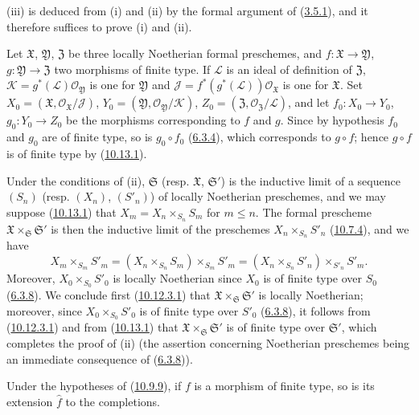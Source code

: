 (iii) is deduced from (i) and (ii) by the formal argument of
(\hyperref[I.3.5.1]{3.5.1}), and it therefore suffices to prove (i) and (ii).

Let $\mathfrak{X}$, $\mathfrak{Y}$, $\mathfrak{Z}$ be three locally
Noetherian formal preschemes, and $f:\mathfrak{X}\to\mathfrak{Y}$,
$g:\mathfrak{Y}\to\mathfrak{Z}$ two morphisms of finite type. If
$\mathscr{L}$ is an ideal of definition of $\mathfrak{Z}$,
$\mathscr{K}=g^*(\mathscr{L})\mathscr{O}_{\mathfrak{Y}}$ is one for
$\mathfrak{Y}$ and
$\mathscr{J}=f^*(g^*(\mathscr{L}))\mathscr{O}_{\mathfrak{X}}$ is one
for $\mathfrak{X}$. Set
$X_0=(\mathfrak{X},\mathscr{O}_{\mathfrak{X}}/\mathscr{J})$,
$Y_0=(\mathfrak{Y},\mathscr{O}_{\mathfrak{Y}}/\mathscr{K})$,
$Z_0=(\mathfrak{Z},\mathscr{O}_{\mathfrak{Z}}/\mathscr{L})$, and let
$f_0:X_0\to Y_0$, $g_0:Y_0\to Z_0$ be the morphisms corresponding to $f$ and
$g$. Since by hypothesis $f_0$ and $g_0$ are of finite type, so is
$g_0\circ f_0$ (\hyperref[I.6.3.4]{6.3.4}), which corresponds to
$g\circ f$; hence $g\circ f$ is of finite type by
(\hyperref[I.10.13.1]{10.13.1}).

Under the conditions of (ii), $\mathfrak{S}$ (resp. $\mathfrak{X}$,
$\mathfrak{S}'$) is the inductive limit of a sequence $(S_n)$ (resp. $(X_n)$,
$(S'_n)$) of locally Noetherian preschemes, and we may suppose
(\hyperref[I.10.13.1]{10.13.1}) that
$X_m=X_n\times_{S_n}S_m$ for $m\leq n$. The formal prescheme
$\mathfrak{X}\times_{\mathfrak{S}}\mathfrak{S}'$ is then the inductive limit
of the preschemes $X_n\times_{S_n}S'_n$
(\hyperref[I.10.7.4]{10.7.4}), and we have
\[
  X_m\times_{S_m}S'_m
  =(X_n\times_{S_n}S_m)\times_{S_m}S'_m
  =(X_n\times_{S_n}S'_n)\times_{S'_n}S'_m.
\]
Moreover, $X_0\times_{S_0}S'_0$ is locally Noetherian since $X_0$
is of finite type over $S_0$ (\hyperref[I.6.3.8]{6.3.8}). We conclude
first (\hyperref[I.10.12.3.1]{10.12.3.1}) that
$\mathfrak{X}\times_{\mathfrak{S}}\mathfrak{S}'$ is locally
Noetherian; moreover, since $X_0\times_{S_0}S'_0$ is of finite type over
$S'_0$ (\hyperref[I.6.3.8]{6.3.8}), it follows from
(\hyperref[I.10.12.3.1]{10.12.3.1}) and from
(\hyperref[I.10.13.1]{10.13.1}) that
$\mathfrak{X}\times_{\mathfrak{S}}\mathfrak{S}'$ is of finite type over
$\mathfrak{S}'$, which completes the proof of (ii) (the assertion concerning
Noetherian preschemes being an immediate consequence of
(\hyperref[I.6.3.8]{6.3.8})).

\begin{corollary}[10.13.6]
\label{I.10.13.6}
Under the hypotheses of \textup{(\hyperref[I.10.9.9]{10.9.9})}, if $f$ is a
morphism of finite type, so is its extension $\widehat f$
to the completions.
\end{corollary}

